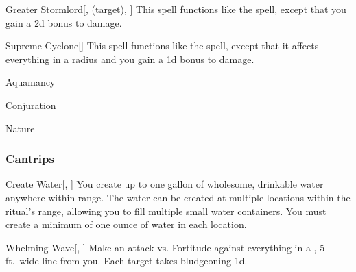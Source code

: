 \lowercase{\hypertarget{spell:Greater Stormlord}{}}\label{spell:Greater Stormlord}
\begin{attuneability}[\nth{6}]{\hypertarget{spell:Greater Stormlord}{Greater Stormlord}}[,  (target), ]
This spell functions like the  spell, except that you gain a \plus2d bonus to damage.
\end{attuneability}
\vspace{0.25em}



\lowercase{\hypertarget{spell:Supreme Cyclone}{}}\label{spell:Supreme Cyclone}
\begin{apability}[\nth{6}]{\hypertarget{spell:Supreme Cyclone}{Supreme Cyclone}}[]
This spell functions like the  spell, except that it affects everything in a \arealarge radius and you gain a \plus1d bonus to damage.
\end{apability}
\vspace{0.25em}


\newpage
\begin{spellsection}{Aquamancy}

\begin{spellheader}
\end{spellheader}


 Conjuration

 Nature

\subsubsection{Cantrips}


\lowercase{\hypertarget{spell:Create Water}{}}\label{spell:Create Water}
\begin{freeability}[\nth{1}]{\hypertarget{spell:Create Water}{Create Water}}[, ]
You create up to one gallon of wholesome, drinkable water anywhere within \rngclose range.
The water can be created at multiple locations within the ritual's range, allowing you to fill multiple small water containers.
You must create a minimum of one ounce of water in each location.
\end{freeability}
\vspace{0.25em}



\begin{freeability}{Whelming Wave}[, ]
Make an attack vs. Fortitude against everything in a \areamed, 5 ft.\ wide line from you.
\hit Each target takes bludgeoning  \minus1d.
\end{freeability}

\end{spellsection}


